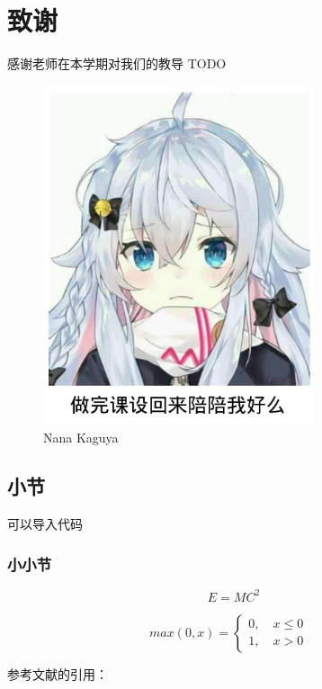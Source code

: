 \documentclass[10pt, conference, compsocconf, a4paper]{IEEEtran}
\begin{document}
\section{致谢}
感谢老师在本学期对我们的教导 TODO



\begin{figure}[h]
  \includegraphics[width=8cm]{img/nana.png}
  \caption{Nana Kaguya}
  \label{Nana Kaguya}
\end{figure}


\subsection{小节}
可以导入代码



\subsubsection{小小节}

\begin{equation}
  E= MC^2
\end{equation}


\begin{equation}
max(0,x)=\left\{
\begin{aligned}
0, \quad x \leq 0 & \\
1, \quad x > 0  &
\end{aligned}
\right.
\end{equation}

参考文献的引用：
\cite{yearbook2005china}



 
   



\end{document}
